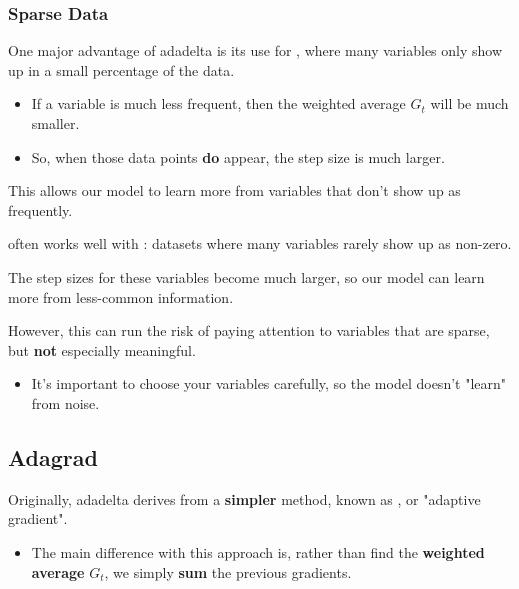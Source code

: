         \phantom{}

        \subsubsection{Sparse Data}

            One major advantage of adadelta is its use for , where many variables only show up in a small percentage of the data.

            \begin{itemize}
                \item If a variable is much less frequent, then the weighted average $G_t$ will be much smaller.
                \item So, when those data points \textbf{do} appear, the step size is much larger.
            \end{itemize}

            This allows our model to learn more from variables that don't show up as frequently.\\

            \begin{concept}
                 often works well with : datasets where many variables rarely show up as non-zero.

                The step sizes for these variables become much larger, so our model can learn more from less-common information.
            \end{concept}

            However, this can run the risk of paying attention to variables that are sparse, but \textbf{not} especially meaningful. 
            
            \begin{itemize}
                \item It's important to choose your variables carefully, so the model doesn't "learn" from noise.
            \end{itemize}

        \phantom{}

        \subsection{Adagrad}

            Originally, adadelta derives from a \textbf{simpler} method, known as , or "adaptive gradient".

            \begin{itemize}
                \item The main difference with this approach is, rather than find the \textbf{weighted average} $G_t$, we simply \textbf{sum} the previous gradients.
            \end{itemize}

